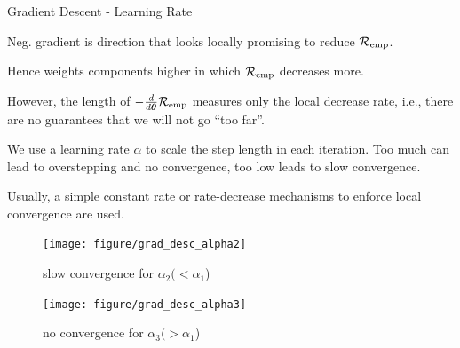 \documentclass[11pt,compress,t,notes=noshow, xcolor=table]{beamer}
\begin{document}
\begin{vbframe}{Gradient Descent - Learning Rate}
  \footnotesize
  \begin{itemizeS}
    \item Neg. gradient is direction that looks locally promising to reduce $\mathcal{R}_{\text{emp}}$.
    \item Hence weights components higher
    in which $\mathcal{R}_{\text{emp}}$ decreases more.
    \item However, the length of $-\frac{d}{d\bm{\theta}}{\mathcal{R}_{\text{emp}}}$ measures only the local decrease rate, i.e., there are no guarantees that we will not go ``too far''.
    \item We use a learning rate $\alpha$ to scale the step length in each iteration. Too much can lead to overstepping and no convergence, too low leads to slow convergence.
    \item Usually, a simple constant rate or rate-decrease mechanisms to enforce local convergence are used.
  \end{itemizeS}
  \vspace{-2ex}

  \begin{figure}[!htb]
    {
    \texttt{[image: figure/grad\_desc\_alpha2]}
    \caption*{\tiny slow convergence for $\alpha_2 (< \alpha_1$)}
    }
    {
    \texttt{[image: figure/grad\_desc\_alpha3]}
    \caption*{\tiny no convergence for $\alpha_3 (> \alpha_1$)}
    }
  \end{figure}
  
\end{vbframe}

\end{document}
